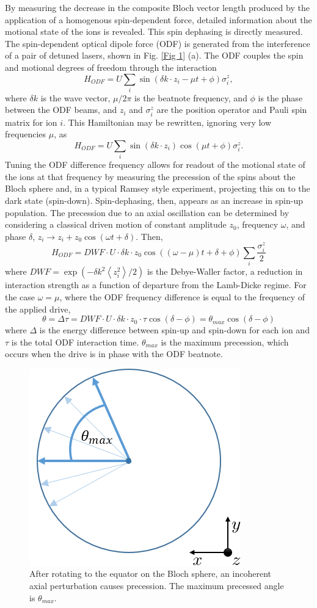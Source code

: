 \documentclass[aps,prl,twocolumn,superscriptaddress,floatfix]{revtex4-1}
\begin{document}
By measuring the decrease in the composite Bloch vector length produced by the application of a homogenous spin-dependent force, detailed information about the motional state of the ions is revealed. This spin dephasing is directly measured. The spin-dependent optical dipole force (ODF) is generated from the interference of a pair of detuned lasers, shown in Fig. \ref{Fig 1} (a). The ODF couples the spin and motional degrees of freedom through the interaction 
\begin{equation}
H_{ODF} = U\sum_{i}\sin(\delta k \cdot z_{i} - \mu t + \phi)\sigma^{z}_{i} ,
\end{equation}
where $\delta k$ is the wave vector, $\mu/2\pi$ is the beatnote frequency, and $\phi$ is the phase between the ODF beams, and $z_i$ and $\sigma^{z}_i$ are the position operator and Pauli spin matrix for ion $i$. This Hamiltonian may be rewritten, ignoring very low frequencies $\mu$, as
\[H_{ODF} = U\sum_{i}\sin(\delta k \cdot z_i)\cos(\mu t + \phi)\sigma^{z}_i. \]
Tuning the ODF difference frequency allows for readout of the motional state of the ions at that frequency by measuring the precession of the spins about the Bloch sphere and, in a typical Ramsey style experiment, projecting this on to the dark state (spin-down). Spin-dephasing, then, appears as an increase in spin-up population. The precession due to an axial oscillation can be determined by considering a classical driven motion of constant amplitude $z_{0}$, frequency $\omega$, and phase $\delta$, $z_i \rightarrow z_i +z_0\cos(\omega t+\delta)$.
Then,
\[H_{ODF} = DWF \cdot U \cdot \delta k \cdot z_0\cos((\omega - \mu)t + \delta + \phi) \sum_{i} \frac{\sigma^{z}_{i}}{2} \]
where $DWF = \exp(-\delta k^2 \left< z^{2}_{i} \right> / 2) $ is the Debye-Waller factor, a reduction in interaction strength as a function of departure from the Lamb-Dicke regime.
For the case $ \omega = \mu $, where the ODF frequency difference is equal to the frequency of the applied drive,
\[\theta = \Delta\tau = DWF \cdot U \cdot \delta k \cdot z_0 \cdot \tau \cos(\delta - \phi) = \theta_{max}\cos(\delta - \phi)\]
where $\Delta$ is the energy difference between spin-up and spin-down for each ion and $\tau$ is the total ODF interaction time. $\theta_{max}$ is the maximum precession, which occurs when the drive is in phase with the ODF beatnote.
\begin{figure}[h]
\includegraphics[width=.15\textwidth]{dephasing}
\caption{After rotating to the equator on the Bloch sphere, an incoherent axial perturbation causes precession. The maximum precessed angle is $\theta_{max}$.}\label{Fig 2}
\end{figure}
\end{document}

